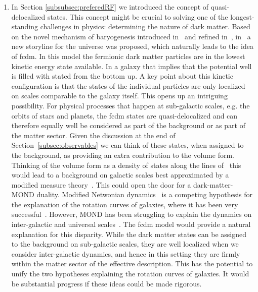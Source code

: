 \documentclass[reqno,11pt]{amsart}
\numberwithin{equation}{section}
\begin{document}
\begin{enumerate}
    \item In Section \ref{subsubsec:preferedRF} we introduced the concept of quasi-delocalized states. This concept might be crucial to solving one of the longest-standing challenges in physics: determining the nature of dark matter. Based on the novel mechanism of baryogenesis introduced in~\cite{baryogenesis} and refined in~\cite{finster2025baryogenesis}, in~\cite{paganini2020proposal} a new storyline for the universe was proposed, which naturally leads to the idea of \ac{fcdm}. In this model the fermionic dark matter particles are in the lowest kinetic energy state available. In a galaxy that implies that the potential well is filled with stated from the bottom up. A key point about this kinetic configuration is that the states of the individual particles are only localized on scales comparable to the galaxy itself. This opens up an intriguing possibility. For physical processes that happen at sub-galactic scales, e.g. the orbits of stars and planets, the \ac{fcdm} states are quasi-delocalized and can therefore equally well be considered as part of the background or as part of the matter sector. Given the discussion at the end of Section~\ref{subsec:observables} we can think of these states, when assigned to the background, as providing an extra contribution to the volume form. Thinking of the volume form as a density of states along the lines of~\cite{isidro2024gravitation} this would lead to a background on galactic scales best approximated by a modified measure theory~\cite{mmt-cfs}. This could open the door for a dark-matter-MOND duality. Modified Netwonian dynamics~\cite{milgrom1983modification} is a competing hypothesis for the explanation of the rotation curves of galaxies, where it has been very successful~\cite{gentile2011things,mcgaugh2012baryonic}. However, MOND has been struggling to explain the dynamics on inter-galactic and universal scales~\cite{conundrum,clowe2006direct,skordis2006large}. The \ac{fcdm} model would provide a natural explanation for this disparity. While the dark matter states can be assigned to the background on sub-galactic scales, they are well localized when we consider inter-galactic dynamics, and hence in this setting they are firmly within the matter sector of the effective description. This has the potential to unify the two hypotheses explaining the rotation curves of galaxies. It would be substantial progress if these ideas could be made rigorous. 
    

\end{enumerate}
\end{document}
